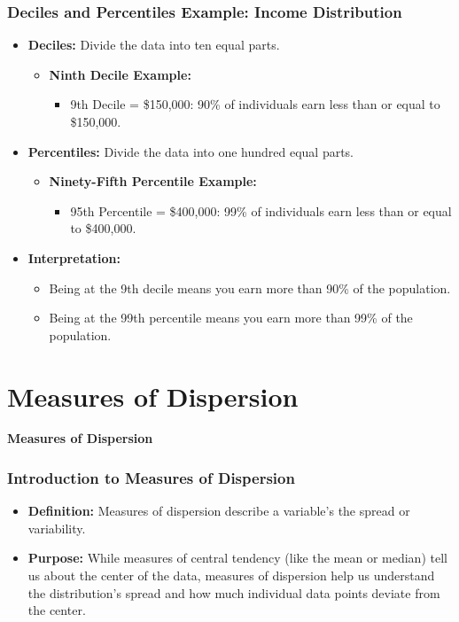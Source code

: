 \documentclass[handout]{beamer} %
\newcommand{\transitionslide}[1]{
    \begin{frame}[plain]
          \addtocounter{framenumber}{-1}
        \centering
        \vspace{1cm}
        \Huge
        \textcolor{moonstoneblue!150}{\textbf{#1}}
    \end{frame}
}
\begin{document}
\begin{frame}
\frametitle{Deciles and Percentiles Example: Income Distribution}
\begin{itemize}
    \item \textbf{Deciles:} Divide the data into ten equal parts.
    \begin{itemize}
        \item \textbf{Ninth Decile Example:}
            \begin{itemize}
                \item 9th Decile = \$150,000: 90\% of individuals earn less than or equal to \$150,000.
            \end{itemize}
    \end{itemize}
    \item \textbf{Percentiles:} Divide the data into one hundred equal parts.
    \begin{itemize}
        \item \textbf{Ninety-Fifth Percentile Example:}
            \begin{itemize}
                \item 95th Percentile = \$400,000: 99\% of individuals earn less than or equal to \$400,000.
            \end{itemize}
    \end{itemize}
    \item \textbf{Interpretation:}
    \begin{itemize}
        \item Being at the 9th decile means you earn more than 90\% of the population.
        \item Being at the 99th percentile means you earn more than 99\% of the population.
    \end{itemize}
\end{itemize}
\end{frame}

\section{Measures of Dispersion}
\transitionslide{Measures of Dispersion}

\begin{frame}
\frametitle{Introduction to Measures of Dispersion}
\begin{itemize}
    \item \textbf{Definition:} Measures of dispersion describe a variable's the spread or variability. 
    \item \textbf{Purpose:} While measures of central tendency (like the mean or median) tell us about the center of the data, measures of dispersion help us understand the distribution's spread and how much individual data points deviate from the center.
\end{itemize}
\end{frame}
\end{document}
